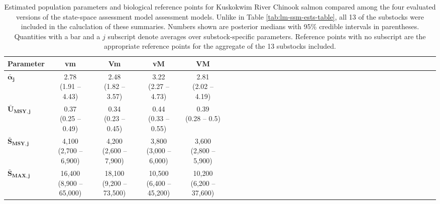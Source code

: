 \documentclass[12pt,]{book}
\theoremstyle{definition}
\theoremstyle{definition}
\theoremstyle{definition}
\theoremstyle{remark}
\begin{document}
\clearpage

\begin{table}[H]

\caption{\label{tab:ssm-ests-table}Estimated population parameters and biological reference points for Kuskokwim River Chinook salmon compared among the four evaluated versions of the state-space assessment model assessment models. Unlike in Table \ref{tab:lm-ssm-ests-table}, all 13 of the substocks were included in the caluclation of these summaries. Numbers shown are posterior medians with 95\% credible intervals in parentheses. Quantities with a bar and a $j$ subscript denote averages over substock-specific parameters. Reference points with no subscript are the appropriate reference points for the aggregate of the 13 substocks included.}
\centering
\begin{tabular}[t]{lcccccclcccccclcccccclcccccclcccccc}
\toprule
\textbf{Parameter} & \textbf{vm} & \textbf{Vm} & \textbf{vM} & \textbf{VM}\\
\midrule
$\boldsymbol{\bar{\alpha}_j}$ & \makecell[c]{2.78\\(1.91 -- 4.43)} & \makecell[c]{2.48\\(1.82 -- 3.57)} & \makecell[c]{3.22\\(2.27 -- 4.73)} & \makecell[c]{2.81\\(2.02 -- 4.19)}\\
$\boldsymbol{\bar{U}_{\text{MSY},j}}$ & \makecell[c]{0.37\\(0.25 -- 0.49)} & \makecell[c]{0.34\\(0.23 -- 0.45)} & \makecell[c]{0.44\\(0.33 -- 0.55)} & \makecell[c]{0.39\\(0.28 -- 0.5)}\\
$\boldsymbol{\bar{S}_{\text{MSY},j}}$ & \makecell[c]{4,100\\(2,700 -- 6,900)} & \makecell[c]{4,200\\(2,600 -- 7,900)} & \makecell[c]{3,800\\(3,000 -- 6,000)} & \makecell[c]{3,600\\(2,800 -- 5,900)}\\
$\boldsymbol{\bar{S}_{\text{MAX},j}}$ & \makecell[c]{16,400\\(8,900 -- 65,000)} & \makecell[c]{18,100\\(9,200 -- 73,500)} & \makecell[c]{10,500\\(6,400 -- 45,200)} & \makecell[c]{10,200\\(6,200 -- 37,600)}\\

\end{tabular}
\end{table}
\end{document}
